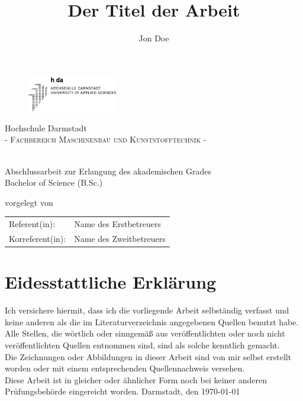 \documentclass[a4paper,12pt]{article}
\title{Der Titel der Arbeit}
\author{Jon Doe}
\begin{document}
\newpage\null\thispagestyle{empty}\newpage
\newpage
\pagestyle{empty}

\begin{figure}[t]
	\centering
	\includegraphics[width=0.35\textwidth]{fig/Logo/logo-h-da.eps}
\end{figure}

\vfill

\begin{center}
\Large Hochschule Darmstadt \\
\normalsize \textsc{- Fachbereich Maschinenbau und Kunststofftechnik -} \\

\vfill

\makeatletter
\Huge \@title \\
\normalsize
\vspace{12pt}
Abschlussarbeit zur Erlangung des akademischen Grades \\ 
Bachelor of Science (B.Sc.)

\vfill

vorgelegt von \\
\@author
\makeatother

\vfill

\begin{tabular}[h]{p{4cm}l}
	Referent(in): & Name des Erstbetreuers\\
	Korreferent(in):  & Name des Zweitbetreuers \\
\end{tabular}

\end{center}

\newpage
\pagestyle{plain}
\section*{Eidesstattliche Erklärung}
Ich versichere hiermit, dass ich die vorliegende Arbeit selbständig verfasst und keine
anderen als die im Literaturverzeichnis angegebenen Quellen benutzt habe. \\
\noindent Alle Stellen, die wörtlich oder sinngemäß aus veröffentlichten oder noch nicht veröffentlichten Quellen entnommen sind, sind als solche kenntlich gemacht. \\
\noindent Die Zeichnungen oder Abbildungen in dieser Arbeit sind von mir selbst erstellt worden oder mit einem entsprechenden Quellennachweis versehen. \\
\noindent Diese Arbeit ist in gleicher oder ähnlicher Form noch bei keiner anderen Prüfungsbehörde eingereicht worden.
\newline\newline
Darmstadt, den \today
\newpage
{}
{}
\begin{abstract}
\blindtext \blindtext
\end{abstract}
\newpage
\end{document}
